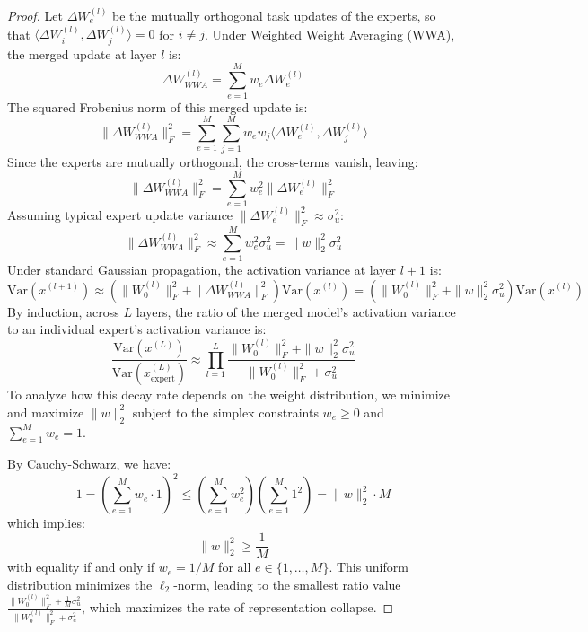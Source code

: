 \documentclass{article}
\theoremstyle{plain}
\theoremstyle{definition}
\theoremstyle{remark}
\begin{document}
\begin{proof}
Let $\Delta W_e^{(l)}$ be the mutually orthogonal task updates of the experts, so that $\langle \Delta W_i^{(l)}, \Delta W_j^{(l)} \rangle = 0$ for $i \neq j$. Under Weighted Weight Averaging (WWA), the merged update at layer $l$ is:
\begin{equation}
    \Delta W_{WWA}^{(l)} = \sum_{e=1}^M w_e \Delta W_e^{(l)}
\end{equation}
The squared Frobenius norm of this merged update is:
\begin{equation}
    \|\Delta W_{WWA}^{(l)}\|_F^2 = \sum_{e=1}^M \sum_{j=1}^M w_e w_j \langle \Delta W_e^{(l)}, \Delta W_j^{(l)} \rangle
\end{equation}
Since the experts are mutually orthogonal, the cross-terms vanish, leaving:
\begin{equation}
    \|\Delta W_{WWA}^{(l)}\|_F^2 = \sum_{e=1}^M w_e^2 \|\Delta W_e^{(l)}\|_F^2
\end{equation}
Assuming typical expert update variance $\|\Delta W_e^{(l)}\|_F^2 \approx \sigma_u^2$:
\begin{equation}
    \|\Delta W_{WWA}^{(l)}\|_F^2 \approx \sum_{e=1}^M w_e^2 \sigma_u^2 = \|w\|_2^2 \sigma_u^2
\end{equation}
Under standard Gaussian propagation, the activation variance at layer $l+1$ is:
\begin{equation}
    \text{Var}(x^{(l+1)}) \approx \left( \|W_0^{(l)}\|_F^2 + \|\Delta W_{WWA}^{(l)}\|_F^2 \right) \text{Var}(x^{(l)}) = \left( \|W_0^{(l)}\|_F^2 + \|w\|_2^2 \sigma_u^2 \right) \text{Var}(x^{(l)})
\end{equation}
By induction, across $L$ layers, the ratio of the merged model's activation variance to an individual expert's activation variance is:
\begin{equation}
    \frac{\text{Var}(x^{(L)})}{\text{Var}(x_{\text{expert}}^{(L)})} \approx \prod_{l=1}^L \frac{\|W_0^{(l)}\|_F^2 + \|w\|_2^2 \sigma_u^2}{\|W_0^{(l)}\|_F^2 + \sigma_u^2}
\end{equation}
To analyze how this decay rate depends on the weight distribution, we minimize and maximize $\|w\|_2^2$ subject to the simplex constraints $w_e \ge 0$ and $\sum_{e=1}^M w_e = 1$.

By Cauchy-Schwarz, we have:
\begin{equation}
    1 = \left( \sum_{e=1}^M w_e \cdot 1 \right)^2 \le \left( \sum_{e=1}^M w_e^2 \right) \left( \sum_{e=1}^M 1^2 \right) = \|w\|_2^2 \cdot M
\end{equation}
which implies:
\begin{equation}
    \|w\|_2^2 \ge \frac{1}{M}
\end{equation}
with equality if and only if $w_e = 1/M$ for all $e \in \{1,\dots,M\}$. This uniform distribution minimizes the $\ell_2$-norm, leading to the smallest ratio value $\frac{\|W_0^{(l)}\|_F^2 + \frac{1}{M}\sigma_u^2}{\|W_0^{(l)}\|_F^2 + \sigma_u^2}$, which maximizes the rate of representation collapse.


\end{proof}
\end{document}
